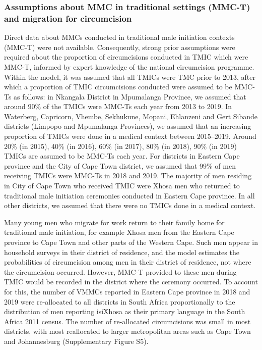 \documentclass{article}
\begin{document}

\subsubsection*{Assumptions about MMC in traditional settings (MMC-T) and migration for circumcision}


Direct data about MMCs conducted in traditional male initiation contexts (MMC-T) were not available. Consequently, strong prior assumptions were required about the proportion of circumcisions conducted in TMIC which were MMC-T, informed by expert knowledge of the national circumcision programme. Within the model, it was assumed that all TMICs were TMC prior to 2013, after which a proportion of TMIC circumcisions conducted were assumed to be MMC-Ts as follows: in Nkangala District in Mpumalanga Province, we assumed that around 90\% of the TMICs were MMC-Ts each year from 2013 to 2019. In Waterberg, Capricorn, Vhembe, Sekhukune, Mopani, Ehlanzeni and Gert Sibande districts (Limpopo and Mpumalanga Provinces), we assumed that an increasing proportion of TMICs were done in a medical context between 2015--2019. Around 20\% (in 2015), 40\% (in 2016), 60\% (in 2017), 80\% (in 2018), 90\% (in 2019) TMICs are assumed to be MMC-Ts each year. For districts in Eastern Cape province and the City of Cape Town district, we assumed that 99\% of men receiving TMICs were MMC-Ts in 2018 and 2019. The majority of men residing in City of Cape Town who received TMIC were Xhosa men who returned to traditional male initiation ceremonies conducted in Eastern Cape province. In all other districts, we assumed that there were no TMICs done in a medical context.

Many young men who migrate for work return to their family home for traditional male initiation, for example Xhosa men from the Eastern Cape province to Cape Town and other parts of the Western Cape. Such men appear in household surveys in their district of residence, and the model estimates the probabilities of circumcision among men in their district of residence, not where the circumcision occurred. However, MMC-T provided to these men during TMIC would be recorded in the district where the ceremony occurred. To account for this, the number of VMMCs reported in Eastern Cape province in 2018 and 2019 were re-allocated to all districts in South Africa proportionally to the distribution of men reporting isiXhosa as their primary language in the South Africa 2011 census. The number of re-allocated circumcisions was small in most districts, with most reallocated to larger metropolitan areas such as Cape Town and Johannesburg (Supplementary Figure S5).
\end{document}
